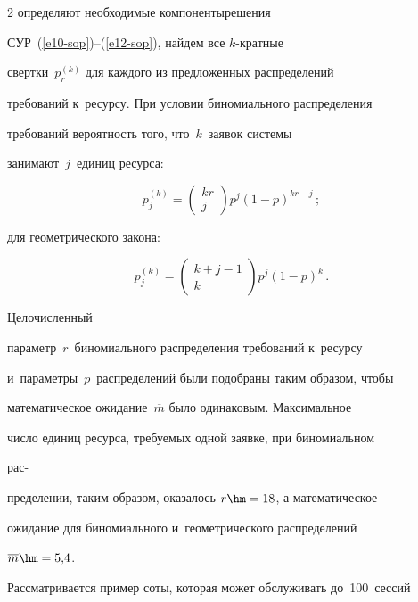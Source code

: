 \begin{multicols}{2}
определяют необходимые компоненты\linebreak реше\-ния 

СУР~(\ref{e10-sop})--(\ref{e12-sop}), найдем все $k$-крат\-ные 

свертки~$p_r^{(k)}$ для каждого из предложенных распределений 

требований к~ресурсу. При условии биномиального распределения 

требований вероятность того, что~$k$~заявок системы 

занимают~$j$~единиц ресурса:

$$

p_j^{(k)}= \begin{pmatrix} kr\\ 

j\end{pmatrix} p^j(1-p)^{kr-j}\,; 

$$

для геометрического закона:

$$

p_j^{(k)}  = \begin{pmatrix} k+j-1\\ k\end{pmatrix} p^j(1-p)^k\,.

$$



 Целочисленный 

параметр~$r$~биномиального распреде\-ления требований к~ресурсу 

и~па\-ра\-мет\-ры~$p$~распределений были подобраны таким образом, чтобы 

математическое ожидание~$\overline{m}$ было одинаковым. Максимальное 

число единиц ресурса, требуемых одной заявке, при биномиальном 

рас-\linebreak\vspace*{-12pt}



\columnbreak



\noindent

пределении, таким образом, оказалось $r\hm=18$, а математическое 

ожидание для биномиального и~геометрического распределений 

$\overline{m}\hm=5{,}4$.

  

  Рассматривается пример соты, которая может обслуживать до~100~сессий 


\end{multicols}
